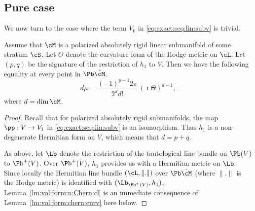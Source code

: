 \subsection{Pure case}\label{sec:vol:form:pure}
We now turn to the case where the term $V_0$ in \eqref{eq:exact:seq:lin:subv} is trivial.
\begin{Lemma}\label{lm:vol:form:n:Chern:cl}
Assume that $\cM$ is a polarized absolutely rigid linear submanifold of some stratum $\cS$.
Let $\Theta$ denote the curvature form of the Hodge metric on $\cL$.
Let $(p,q)$ be the signature of the restriction of $h_1$ to $V$.
Then we have the following equality at every point in $\Pb\hat{\cM}$.
\[ d\mu=\frac{(-1)^{p-1}2\pi}{2^dd!}\,(\imath\Theta)^{d-1},\]
where $d=\dim\cM$.
\end{Lemma}
\begin{proof}
Recall that for polarized absolutely rigid submanifolds, the map $\pp:V \to V_1$ in \eqref{eq:exact:seq:lin:subv} is an isomorphism.
Thus $h_1$ is a non-degenerate Hermitian form on $V$, which means that $d=p+q$.

As above, let $\Lb$ denote the restriction of the tautological line bundle on $\Pb(V)$ to $\Pb^+(V)$. Over $\Pb^+(V)$, $h_1$ provides us with a Hermitian metric on $\Lb$.
Since locally the Hermitian line bundle $(\cL,\|.\|)$ over $\Pb\hat{\cM}$ (where $\|.\|$ is the Hodge metric) is identified with $(\Lb_{\Pb^+(V)},h_1)$, Lemma~\ref{lm:vol:form:n:Chern:cl} is an immediate consequence of Lemma~\ref{lm:vol:form:chern:curv} here below.
\end{proof}

